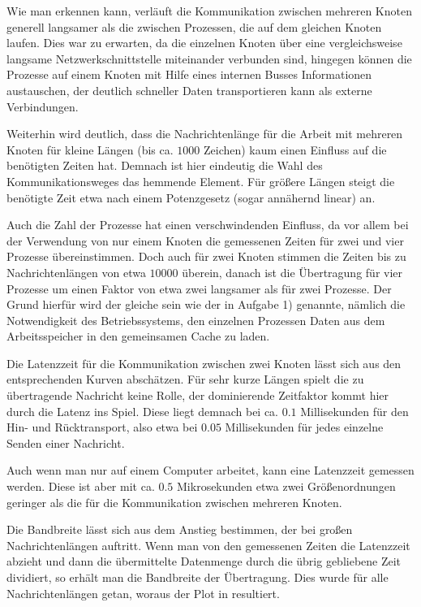 Wie man erkennen kann, verläuft die Kommunikation zwischen mehreren Knoten generell
langsamer als die zwischen Prozessen, die auf dem gleichen Knoten laufen. Dies war 
zu erwarten, da die einzelnen Knoten über eine vergleichsweise langsame Netzwerkschnittstelle
miteinander verbunden sind, hingegen können die Prozesse auf einem Knoten mit Hilfe
eines internen Busses Informationen austauschen, der deutlich schneller Daten
transportieren kann als externe Verbindungen.

Weiterhin wird deutlich, dass die Nachrichtenlänge für die Arbeit mit mehreren
Knoten für kleine Längen (bis ca. $1000$ Zeichen) kaum einen Einfluss auf die
benötigten Zeiten hat. Demnach ist hier eindeutig die Wahl des Kommunikationsweges
das hemmende Element. Für größere Längen steigt die benötigte Zeit etwa nach einem 
Potenzgesetz (sogar annähernd linear) an. 

Auch die Zahl der Prozesse hat einen verschwindenden Einfluss, da vor allem bei der
Verwendung von nur einem Knoten die gemessenen Zeiten für zwei und vier Prozesse
übereinstimmen. Doch auch für zwei Knoten stimmen die Zeiten bis zu Nachrichtenlängen 
von etwa $10000$ überein, danach ist die Übertragung für vier Prozesse um einen Faktor
von etwa zwei langsamer als für zwei Prozesse. Der Grund hierfür wird der gleiche
sein wie der in Aufgabe 1) genannte, nämlich die Notwendigkeit des Betriebssystems,
den einzelnen Prozessen Daten aus dem Arbeitsspeicher in den gemeinsamen Cache zu laden.

Die Latenzzeit für die Kommunikation zwischen zwei Knoten lässt sich aus den entsprechenden
Kurven abschätzen. Für sehr kurze Längen spielt die zu übertragende Nachricht keine Rolle,
der dominierende Zeitfaktor kommt hier durch die Latenz ins Spiel. Diese liegt demnach bei
ca. $0.1$ Millisekunden für den Hin- und Rücktransport, also etwa bei $0.05$ Millisekunden
für jedes einzelne Senden einer Nachricht.

Auch wenn man nur auf einem Computer arbeitet, kann eine Latenzzeit gemessen werden.
Diese ist aber mit ca. $0.5$ Mikrosekunden etwa zwei Größenordnungen geringer als die
für die Kommunikation zwischen mehreren Knoten.

Die Bandbreite lässt sich aus dem Anstieg bestimmen, der bei großen Nachrichtenlängen
auftritt. Wenn man von den gemessenen Zeiten die Latenzzeit abzieht und dann die
übermittelte Datenmenge durch die übrig gebliebene Zeit dividiert, so erhält man 
die Bandbreite der Übertragung. Dies wurde für alle Nachrichtenlängen getan, woraus
der Plot in  resultiert.

